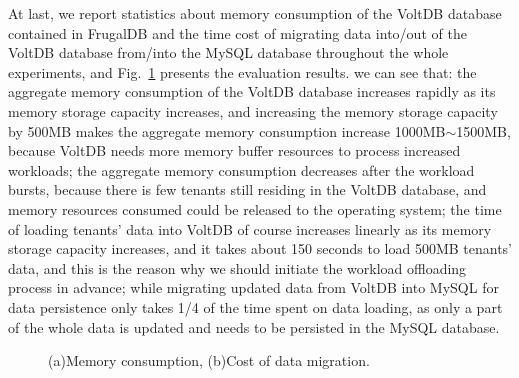 At last, we report statistics about memory consumption of the VoltDB database contained in FrugalDB and the time cost of migrating data into/out of the VoltDB database from/into the MySQL database throughout the whole experiments, and Fig.~\ref{fig:mc-dm} presents the evaluation results. we can see that: the aggregate memory consumption of the VoltDB database increases rapidly as its memory storage capacity increases, and increasing the memory storage capacity by 500MB makes the aggregate memory consumption increase 1000MB$\sim$1500MB, because VoltDB needs more memory buffer resources to process increased workloads; the aggregate memory consumption decreases after the workload bursts, because there is few tenants still residing in the VoltDB database, and memory resources consumed could be released to the operating system; the time of loading tenants' data into VoltDB of course increases linearly as its memory storage capacity increases, and it takes about 150 seconds to load 500MB tenants' data, and this is the reason why we should initiate the workload offloading process in advance; while migrating updated data from VoltDB into MySQL for data persistence only takes 1/4 of the time spent on data loading, as only a part of the whole data is updated and needs to be persisted in the MySQL database.

\begin{figure}[!htb]
\caption{(a)Memory consumption, (b)Cost of data migration.}
\label{fig:mc-dm}
\end{figure}


